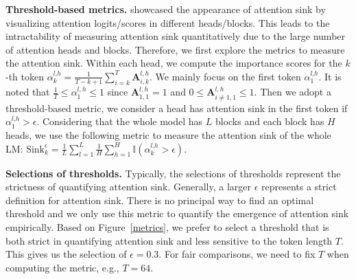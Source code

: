 
\textbf{Threshold-based metrics.} \citet{xiao2023efficient} showcased the appearance of attention sink by visualizing attention logits/scores in different heads/blocks. This leads to the intractability of measuring attention sink quantitatively due to the large number of attention heads and blocks. Therefore, we first explore the metrics to measure the attention sink. Within each head, we compute the importance scores for the $k$-th token $\alpha_k^{l\textrm{,}h}=\frac{1}{T-k+1}\sum_{i=k}^T \boldsymbol{A}_{i\textrm{,}\,k}^{l\textrm{,}\,h}$. We mainly focus on the first token $\alpha_1^{l\textrm{,}h}$. It is noted that $\frac{1}{T}\leq \alpha_1^{l\textrm{,}\,h}\leq 1$ since $\boldsymbol{A}_{1\textrm{,}\,1}^{l\textrm{,}\,h}=1$ and $0\leq \boldsymbol{A}_{i\neq 1\textrm{,}\,1}^{l\textrm{,}\,h}\leq 1$. Then we adopt a threshold-based metric, we consider a head has attention sink in the first token if $\alpha_1^{l\textrm{,}h}>\epsilon$. Considering that the whole model has $L$ blocks and each block has $H$ heads, we use the following metric to measure the attention sink of the whole LM: {\color{red!20!violet}$\textrm{Sink}_k^{\epsilon}=\frac{1}{L}\sum_{l=1}^L\frac{1}{H}\sum_{h=1}^H\mathbb{I}(\alpha_k^{l\textrm{,}h}>\epsilon)$}.




\textbf{Selections of thresholds.} Typically, the selections of thresholds represent the strictness of quantifying attention sink. Generally, a larger $\epsilon$ represents a strict definition for attention sink. There is no principal way to find an optimal threshold and we only use this metric to quantify the emergence of attention sink empirically. Based on Figure~\ref{metrics}, we prefer to select a threshold that is both strict in quantifying attention sink and less sensitive to the token length $T$. This gives us the selection of $\epsilon=\textrm{0.3}$. For fair comparisons, we need to fix $T$ when computing the metric, e.g., $T=\textrm{64}$. %




